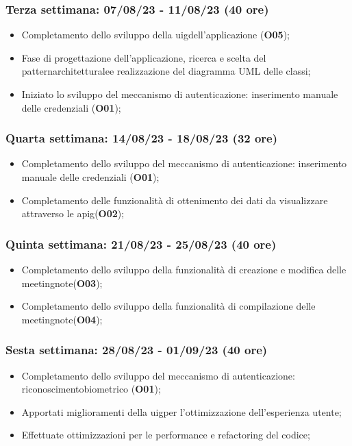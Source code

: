 \subsubsection{Terza settimana: 07/08/23 - 11/08/23 (40 ore)}
    \begin{itemize}
        \item Completamento dello sviluppo della \gls{uig}\glsoccur dell'applicazione (\textbf{O05});
        \item Fase di progettazione dell'applicazione, ricerca e scelta del \gls{patternarchitetturale}\glsoccur e realizzazione del diagramma UML delle classi;
        \item Iniziato lo sviluppo del meccanismo di autenticazione: inserimento manuale delle credenziali (\textbf{O01});
    \end{itemize}
\subsubsection{Quarta settimana: 14/08/23 - 18/08/23 (32 ore)}
    \begin{itemize}
        \item Completamento dello sviluppo del meccanismo di autenticazione: inserimento manuale delle
        credenziali (\textbf{O01});
        \item Completamento delle funzionalità di ottenimento dei dati da visualizzare attraverso le \gls{apig}\glsoccur (\textbf{O02});
    \end{itemize}
\subsubsection{Quinta settimana: 21/08/23 - 25/08/23 (40 ore)}
    \begin{itemize}
        \item Completamento dello sviluppo della funzionalità di creazione e modifica delle \gls{meetingnote}\glsoccur (\textbf{O03});
        \item Completamento dello sviluppo della funzionalità di compilazione delle \gls{meetingnote}\glsoccur (\textbf{O04});
    \end{itemize}
\subsubsection{Sesta settimana: 28/08/23 - 01/09/23 (40 ore)}
    \begin{itemize}
        \item Completamento dello sviluppo del meccanismo di autenticazione: \gls{riconoscimentobiometrico} (\textbf{O01});
        \item Apportati miglioramenti della \gls{uig}\glsoccur per l'ottimizzazione dell'esperienza utente;
        \item Effettuate ottimizzazioni per le performance e refactoring del codice;
    \end{itemize}

